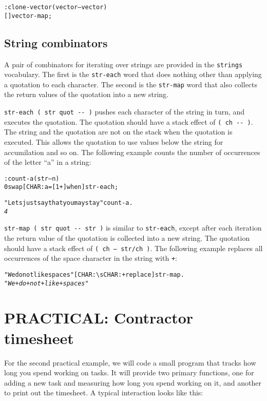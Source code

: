 \documentclass[english]{article}
\begin{document}
\begin{alltt}
: clone-vector ( vector -- vector )
    {[} {]} vector-map ;
\end{alltt}

\subsection{String combinators}

A pair of combinators for iterating over strings are provided in the \texttt{strings} vocabulary. The first is the \texttt{str-each} word that does nothing other than applying a quotation to each character. The second is the \texttt{str-map} word that also collects the return values of the quotation into a new string.

\texttt{str-each ( str quot -{}- )} pushes each character of the string in turn, and executes the quotation. The quotation should have a stack effect of \texttt{( ch -{}- )}. The string and the quotation are not on the stack when the quotation is executed. This allows the quotation to use values below the string for accumilation and so on. The following example counts the number of occurrences of the letter ``a'' in a string:

\begin{alltt}
: count-a ( str -- n )
    0 swap {[} CHAR: a = {[} 1 + {]} when {]} str-each ;

"Lets just say that you may stay" count-a .
\emph{4}
\end{alltt}

\texttt{str-map ( str quot -{}- str )} is similar to \texttt{str-each}, except after each iteration the return value of the quotation is collected into a new string. The quotation should have a stack effect of \texttt{( ch -- str/ch )}. The following example replaces all occurrences of the space character in the string with \texttt{+}:

\begin{alltt}
"We do not like spaces" {[} CHAR: \textbackslash{}s CHAR: + replace {]} str-map .
\emph{"We+do+not+like+spaces"}
\end{alltt}

\section{PRACTICAL: Contractor timesheet}

For the second practical example, we will code a small program that tracks how long you spend working on tasks. It will provide two primary functions, one for adding a new task and measuring how long you spend working on it, and another to print out the timesheet. A typical interaction looks like this:
\end{document}
